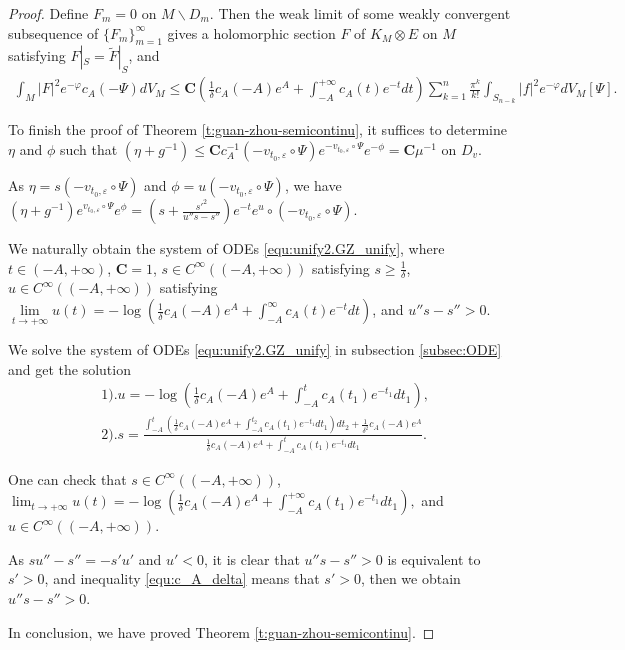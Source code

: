 \begin{proof}
Define $F_m=0$ on $M\backslash D_m$. Then the weak limit of some
weakly convergent subsequence of $\{F_m\}_{m=1}^\infty$ gives a
holomorphic section $F$ of $K_{M}\otimes E$ on $M$ satisfying
$F|_{S}=\tilde{F}|_{S}$, and
\begin{equation}
\begin{split}
\int_{ M}|F|^{2}e^{-\varphi}c_{A}(-\Psi)dV_{M}
\leq\mathbf{C}(\frac{1}{\delta}c_{A}(-A)e^{A}+
\int_{-A}^{+\infty}c_{A}(t)e^{-t}dt)\sum_{k=1}^{n}\frac{\pi^{k}}{k!}\int_{S_{n-k}}|f|^{2}e^{-\varphi}dV_{M}[\Psi].
\end{split}
\end{equation}

To finish the proof of Theorem \ref{t:guan-zhou-semicontinu}, it
suffices to determine $\eta$ and $\phi$ such that $(\eta+g^{-1})\leq
\mathbf{C}c^{-1}_{A}(-v_{t_0,\varepsilon}\circ\Psi)e^{-v_{t_0,\varepsilon}\circ\Psi}e^{-\phi}=\mathbf{C}\mu^{-1}$
on $D_v$.

As $\eta=s(-v_{t_0,\varepsilon}\circ\Psi)$ and
$\phi=u(-v_{t_0,\varepsilon}\circ\Psi)$, we have $(\eta+g^{-1})
e^{v_{t_0,\varepsilon}\circ\Psi}e^{\phi}=(s+\frac{s'^{2}}{u''s-s''})e^{-t}e^{u}\circ(-v_{t_0,\varepsilon}\circ\Psi)$.

We naturally obtain the system of ODEs \ref{equ:unify2.GZ_unify},
where $t\in(-A,+\infty)$, $\mathbf{C}=1$, $s\in
C^{\infty}((-A,+\infty))$ satisfying $s\geq \frac{1}{\delta}$, $u\in
C^{\infty}((-A,+\infty))$ satisfying
$\lim\limits_{t\to+\infty}u(t)=-\log(\frac{1}{\delta}c_{A}(-A)e^{A}+\int_{-A}^{\infty}c_{A}(t)e^{-t}dt)$,
and $u''s-s''>0$.

We solve the system of ODEs \ref{equ:unify2.GZ_unify} in subsection
\ref{subsec:ODE} and get the solution
\begin{equation}
\begin{split}
&1).u=-\log(\frac{1}{\delta}c_{A}(-A)e^{A}+\int_{-A}^{t}c_{A}(t_{1})e^{-t_{1}}dt_{1}),
\\&
2).s=\frac{\int_{-A}^{t}(\frac{1}{\delta}c_{A}(-A)e^{A}+\int_{-A}^{t_{2}}c_{A}(t_{1})e^{-t_{1}}dt_{1})dt_{2}
+\frac{1}{\delta^{2}}c_{A}(-A)e^{A}}
{\frac{1}{\delta}c_{A}(-A)e^{A}+\int_{-A}^{t}c_{A}(t_{1})e^{-t_{1}}dt_{1}}.
\end{split}
\end{equation}

One can check that $s\in C^{\infty}((-A,+\infty))$,
$\lim_{t\to+\infty}u(t)=-\log(\frac{1}{\delta}c_{A}(-A)e^{A}+\int_{-A}^{+\infty}c_{A}(t_{1})e^{-t_{1}}dt_{1}),$
and $u\in C^{\infty}((-A,+\infty))$.

As $su''-s''=-s'u'$ and $u'<0$, it is clear that $u''s-s''>0$ is
equivalent to $s'>0$, and inequality \ref{equ:c_A_delta} means that
$s'>0$, then we obtain $u''s-s''>0$.

In conclusion, we have proved Theorem \ref{t:guan-zhou-semicontinu}.
\end{proof}

